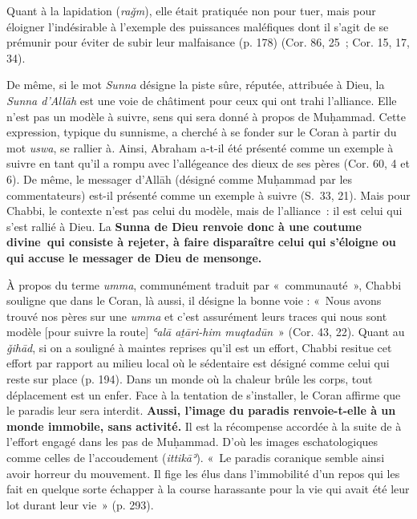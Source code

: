 
Quant à la lapidation (\emph{raǧm}), elle était pratiquée non pour tuer,
mais pour éloigner l'indésirable à l'exemple des puissances maléfiques
dont il s'agit de se prémunir pour éviter de subir leur malfaisance (p.
178) (Cor. 86, 25~; Cor. 15, 17, 34).


De même, si le mot \emph{Sunna} désigne la piste sûre, réputée,
attribuée à Dieu, la \emph{Sunna d'Allāh} est une voie de châtiment pour
ceux qui ont trahi l'alliance. Elle n'est pas un modèle à suivre, sens
qui sera donné à propos de Muḥammad. Cette expression, typique du
sunnisme, a cherché à se fonder sur le Coran à partir du mot
\emph{uswa}, se rallier à\emph{.} Ainsi, Abraham a-t-il été présenté
comme un exemple à suivre en tant qu'il a rompu avec l'allégeance des
dieux de ses pères (Cor. 60, 4 et 6). De même, le messager d'Allāh
(désigné comme Muḥammad par les commentateurs) est-il présenté comme un
exemple à suivre (S.~33, 21). Mais pour Chabbi, le contexte n'est pas
celui du modèle, mais de l'alliance~: il est celui qui s'est rallié à
Dieu. La \textbf{Sunna de Dieu renvoie donc à une coutume divine~qui
consiste à rejeter, à faire disparaître celui qui s'éloigne ou qui
accuse le messager de Dieu de mensonge.}

À propos du terme \emph{umma}, communément traduit par «~communauté~»,
Chabbi souligne que dans le Coran, là aussi, il désigne la bonne voie :
«~Nous avons trouvé nos pères sur une \emph{umma} et c'est assurément
leurs traces qui nous sont modèle {[}pour suivre la route{]} \emph{ʿalā
aṯāri-him muqtadūn}~» (Cor. 43, 22). Quant au \emph{ǧihād}, si on a
souligné à maintes reprises qu'il est un effort, Chabbi resitue cet
effort par rapport au milieu local où le sédentaire est désigné comme
celui qui reste sur place (p. 194). Dans un monde où la chaleur brûle
les corps, tout déplacement est un enfer. Face à la tentation de
s'installer, le Coran affirme que le paradis leur sera interdit.
\textbf{Aussi, l'image du paradis renvoie-t-elle à un monde immobile,
sans activité.} Il est la récompense accordée à la suite de à l'effort
engagé dans les pas de Muḥammad. D'où les images eschatologiques comme
celles de l'accoudement (\emph{ittikāʾ}). «~Le paradis coranique semble
ainsi avoir horreur du mouvement. Il fige les élus dans l'immobilité
d'un repos qui les fait en quelque sorte échapper à la course harassante
pour la vie qui avait été leur lot durant leur vie~» (p. 293).

